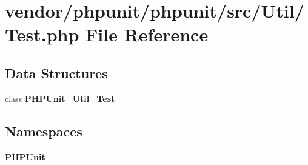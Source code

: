 \section{vendor/phpunit/phpunit/src/\+Util/\+Test.php File Reference}
\label{_util_2_test_8php}
\subsection*{Data Structures}
\begin{DoxyCompactItemize}
\item 
class {\bf P\+H\+P\+Unit\+\_\+\+Util\+\_\+\+Test}
\end{DoxyCompactItemize}
\subsection*{Namespaces}
\begin{DoxyCompactItemize}
\item 
 {\bf P\+H\+P\+Unit}
\end{DoxyCompactItemize}
